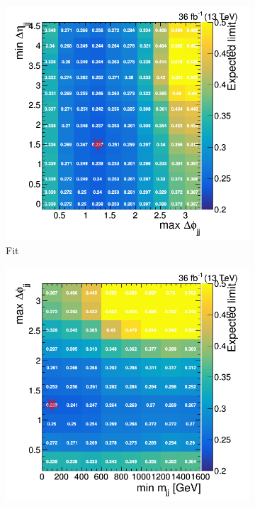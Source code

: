 \begin{figure}[]
    \begin{center}
        \begin{subfigure}[t]{0.32\textwidth}
            \includegraphics[width=\textwidth]{figures/vbf/opt/optimized_scan_deta_fabsdphi.png}
            \caption{Fit \mjj}
        \end{subfigure}
        \begin{subfigure}[t]{0.32\textwidth}
            \includegraphics[width=\textwidth]{figures/vbf/opt/optimized_scan_fabsdphi_mjj.png}

\end{subfigure}
\end{center}
\end{figure}
